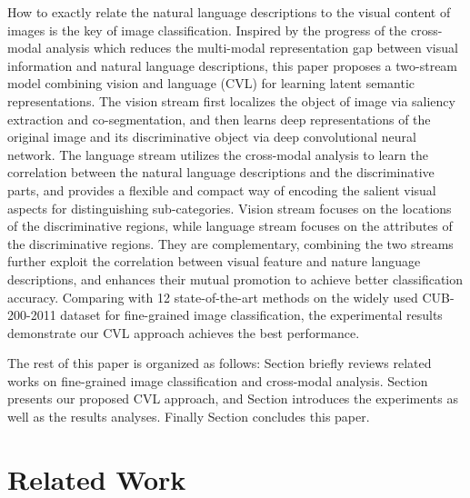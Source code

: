 \documentclass[10pt,twocolumn,letterpaper]{article}
\begin{document}
How to exactly relate the natural language descriptions to the visual content of images is the key of image classification. Inspired by the progress of the cross-modal analysis which reduces the multi-modal representation gap between visual information and natural language descriptions, this paper proposes a two-stream model combining vision and language (CVL) for learning latent semantic representations. The vision stream first localizes the object of image via saliency extraction and co-segmentation, and then learns deep representations of the original image and its discriminative object via deep convolutional neural network. The language stream utilizes the cross-modal analysis to learn the correlation between the natural language descriptions and the discriminative parts, and provides a flexible and compact way of encoding the salient visual aspects for distinguishing sub-categories. Vision stream focuses on the locations of the discriminative regions, while language stream focuses on the attributes of the discriminative regions. They are complementary, combining the two streams further exploit the correlation between visual feature and nature language descriptions, and enhances their mutual promotion to achieve better classification accuracy. Comparing with 12 state-of-the-art methods on the widely used CUB-200-2011 dataset for fine-grained image classification, the experimental results demonstrate our CVL approach achieves the best performance.
\par
The rest of this paper is organized as follows: Section \uppercase\expandafter{} briefly reviews related works on fine-grained image classification and cross-modal analysis. Section \uppercase\expandafter{} presents our proposed CVL approach, and Section \uppercase\expandafter{} introduces the experiments as well as the results analyses. Finally Section \uppercase\expandafter{} concludes this paper.


\section{Related Work}
\end{document}
